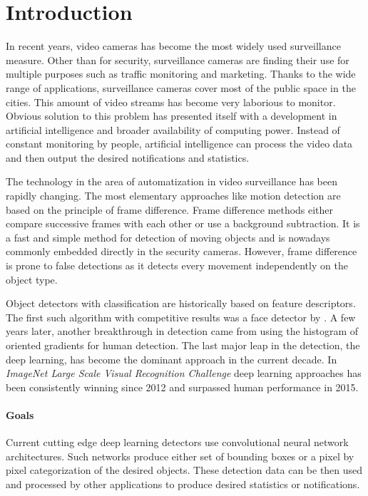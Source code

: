 \chapter*{Introduction}

In recent years, video cameras has become the most widely used surveillance measure. Other than for security, surveillance cameras are finding their use for multiple purposes such as traffic monitoring and marketing. Thanks to the wide range of applications, surveillance cameras cover most of the public space in the cities. This amount of video streams has become very laborious to monitor. Obvious solution to this problem has presented itself with a development in artificial intelligence and broader availability of computing power. Instead of constant monitoring by people, artificial intelligence can process the video data and then output the desired notifications and statistics. 

The technology in the area of automatization in video surveillance has been rapidly changing. The most elementary approaches like motion detection are based on the principle of frame difference. Frame difference methods either compare successive frames with each other or use a background subtraction. It is a fast and simple method for detection of moving objects and is nowadays commonly embedded directly in the security cameras. However, frame difference is prone to false detections as it detects every movement independently on the object type. 

Object detectors with classification are historically based on feature descriptors. The first such algorithm with competitive results was a face detector by \citeauthor{bib:viola}. A few years later, another breakthrough in detection came from \citeauthor{bib:hog} using the histogram of oriented gradients for human detection. The last major leap in the detection, the deep learning, has become the dominant approach in the current decade. In \textit{ImageNet Large Scale Visual Recognition Challenge} deep learning approaches has been consistently winning since 2012 and surpassed human performance in 2015.

\subsubsection{Goals}
Current cutting edge deep learning detectors use convolutional neural network architectures. Such networks produce either set of bounding boxes or a pixel by pixel categorization of the desired objects. These detection data can be then used and processed by other applications to produce desired statistics or notifications.

